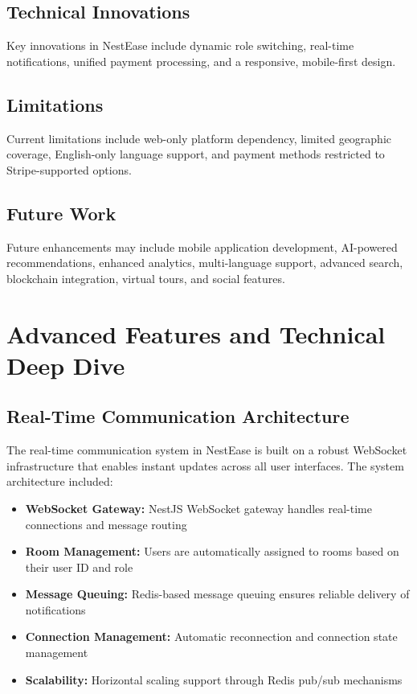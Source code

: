 \documentclass[conference]{IEEEtran}
\begin{document}
\subsection{Technical Innovations}
Key innovations in NestEase include dynamic role switching, real-time notifications, unified payment processing, and a responsive, mobile-first design.

\subsection{Limitations}
Current limitations include web-only platform dependency, limited geographic coverage, English-only language support, and payment methods restricted to Stripe-supported options.

\subsection{Future Work}
Future enhancements may include mobile application development, AI-powered recommendations, enhanced analytics, multi-language support, advanced search, blockchain integration, virtual tours, and social features.

\section{Advanced Features and Technical Deep Dive}
\subsection{Real-Time Communication Architecture}
The real-time communication system in NestEase is built on a robust WebSocket infrastructure that enables instant updates across all user interfaces. The system architecture included:

\begin{itemize}
    \item \textbf{WebSocket Gateway:} NestJS WebSocket gateway handles real-time connections and message routing
    \item \textbf{Room Management:} Users are automatically assigned to rooms based on their user ID and role
    \item \textbf{Message Queuing:} Redis-based message queuing ensures reliable delivery of notifications
    \item \textbf{Connection Management:} Automatic reconnection and connection state management
    \item \textbf{Scalability:} Horizontal scaling support through Redis pub/sub mechanisms
\end{itemize}
\end{document}
